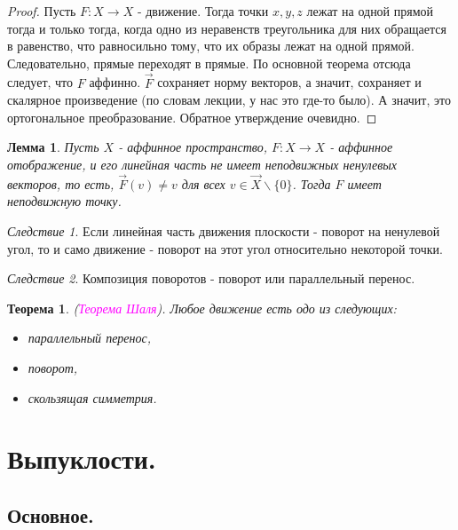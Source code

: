 \documentclass[a4paper,100pt]{article}
\theoremstyle{indented}
\newtheorem{theorem}{Теорема}
\newtheorem{lemma}{Лемма}
\theoremstyle{definition}
\theoremstyle{remark}
\newtheorem{cons}{Следствие}
\DeclareMathOperator{\ra}{\rightarrow}
\begin{document}
\begin{proof}
    Пусть $F: X \ra X$ - движение. Тогда точки $x, y, z$ лежат на одной прямой тогда и только тогда, когда одно из неравенств треугольника для них обращается в равенство, что равносильно тому, что их образы лежат на одной прямой. Следовательно, прямые переходят в прямые. По основной теорема отсюда следует, что $F$ аффинно. $\vec{F}$ сохраняет норму векторов, а значит, сохраняет и скалярное произведение (по словам лекции, у нас это где-то было). А значит, это ортогональное преобразование. Обратное утверждение очевидно.
\end{proof}

\begin{lemma}
    Пусть $X$ - аффинное пространство, $F:X\ra X$ - аффинное отображение, и его линейная часть не имеет неподвижных ненулевых векторов, то есть, $\vec{F}(v)\neq v$ для всех $v\in \vec{X}\backslash \{0\}$. Тогда $F$ имеет неподвижную точку. 
\end{lemma}

\begin{cons}
    Если линейная часть движения плоскости - поворот на ненулевой угол, то и само движение - поворот на этот угол относительно некоторой точки.
\end{cons}

\begin{cons}
    Композиция поворотов - поворот или параллельный перенос.
\end{cons}

\begin{theorem}
    (\textit{\textcolor{magenta}{\hypertarget{s87}{Теорема Шаля}}}). Любое движение есть одо из следующих: 

    \begin{itemize}
        \item параллельный перенос,
        \item поворот, 
        \item скользящая симметрия.
    \end{itemize}
\end{theorem}

\section{Выпуклости.}

\subsection{Основное.}
\end{document}
